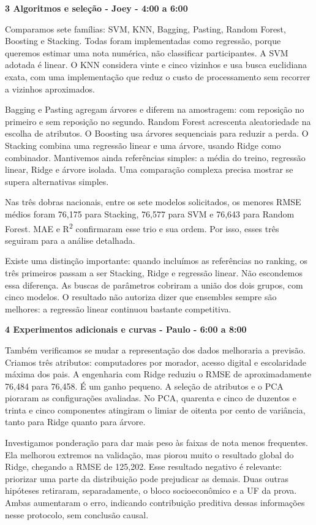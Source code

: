 \documentclass[12pt,a4paper]{article}
\newcommand{\heading}[1]{\par\Needspace{4\baselineskip}\noindent\textbf{#1}\par\vspace{5pt}}
\begin{document}
\heading{3 Algoritmos e seleção - Joey - 4:00 a 6:00}
Comparamos sete famílias: SVM, KNN, Bagging, Pasting, Random Forest, Boosting e Stacking. Todas foram implementadas como regressão, porque queremos estimar uma nota numérica, não classificar participantes. A SVM adotada é linear. O KNN considera vinte e cinco vizinhos e usa busca euclidiana exata, com uma implementação que reduz o custo de processamento sem recorrer a vizinhos aproximados.


Bagging e Pasting agregam árvores e diferem na amostragem: com reposição no primeiro e sem reposição no segundo. Random Forest acrescenta aleatoriedade na escolha de atributos. O Boosting usa árvores sequenciais para reduzir a perda. O Stacking combina uma regressão linear e uma árvore, usando Ridge como combinador. Mantivemos ainda referências simples: a média do treino, regressão linear, Ridge e árvore isolada. Uma comparação complexa precisa mostrar se supera alternativas simples.


Nas três dobras nacionais, entre os sete modelos solicitados, os menores RMSE médios foram 76,175 para Stacking, 76,577 para SVM e 76,643 para Random Forest. MAE e R\textsuperscript{2} confirmaram esse trio e sua ordem. Por isso, esses três seguiram para a análise detalhada.


Existe uma distinção importante: quando incluímos as referências no ranking, os três primeiros passam a ser Stacking, Ridge e regressão linear. Não escondemos essa diferença. As buscas de parâmetros cobriram a união dos dois grupos, com cinco modelos. O resultado não autoriza dizer que ensembles sempre são melhores: a regressão linear continuou bastante competitiva.


\heading{4 Experimentos adicionais e curvas - Paulo - 6:00 a 8:00}
Também verificamos se mudar a representação dos dados melhoraria a previsão. Criamos três atributos: computadores por morador, acesso digital e escolaridade máxima dos pais. A engenharia com Ridge reduziu o RMSE de aproximadamente 76,484 para 76,458. É um ganho pequeno. A seleção de atributos e o PCA pioraram as configurações avaliadas. No PCA, quarenta e cinco de duzentos e trinta e cinco componentes atingiram o limiar de oitenta por cento de variância, tanto para Ridge quanto para árvore.


Investigamos ponderação para dar mais peso às faixas de nota menos frequentes. Ela melhorou extremos na validação, mas piorou muito o resultado global do Ridge, chegando a RMSE de 125,202. Esse resultado negativo é relevante: priorizar uma parte da distribuição pode prejudicar as demais. Duas outras hipóteses retiraram, separadamente, o bloco socioeconômico e a UF da prova. Ambas aumentaram o erro, indicando contribuição preditiva dessas informações nesse protocolo, sem conclusão causal.
\end{document}
